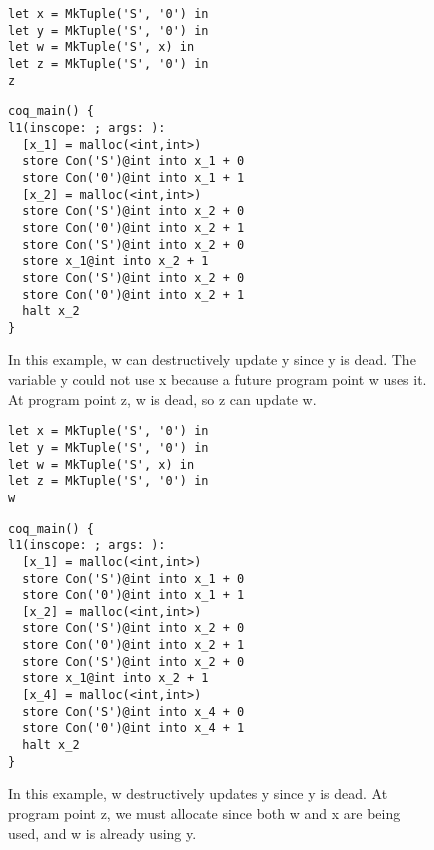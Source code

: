 \documentclass{article}
\begin{document}
\begin{figure}
\centering
\begin{minipage}[t]{.4\textwidth}
\begin{lstlisting}
let x = MkTuple('S', '0') in
let y = MkTuple('S', '0') in
let w = MkTuple('S', x) in
let z = MkTuple('S', '0') in
z
\end{lstlisting}
\end{minipage}
\hspace{20pt}
\begin{minipage}[t]{.4\textwidth}
\begin{lstlisting}
coq_main() {
l1(inscope: ; args: ):
  [x_1] = malloc(<int,int>)
  store Con('S')@int into x_1 + 0
  store Con('0')@int into x_1 + 1
  [x_2] = malloc(<int,int>)
  store Con('S')@int into x_2 + 0
  store Con('0')@int into x_2 + 1
  store Con('S')@int into x_2 + 0
  store x_1@int into x_2 + 1
  store Con('S')@int into x_2 + 0
  store Con('0')@int into x_2 + 1
  halt x_2
}
\end{lstlisting}
\end{minipage}
\label{fig:dupdate2}
\caption{In this example, w can destructively update y since y is
  dead. The variable y could not use x because a future program point
  w uses it. At program point z, w is dead, so z can update w. }
\end{figure}

\begin{figure}
\centering
\begin{minipage}[t]{.4\textwidth}
\begin{lstlisting}
let x = MkTuple('S', '0') in
let y = MkTuple('S', '0') in
let w = MkTuple('S', x) in
let z = MkTuple('S', '0') in
w
\end{lstlisting}
\end{minipage}
\hspace{20pt}
\begin{minipage}[t]{.4\textwidth}
\begin{lstlisting}
coq_main() {
l1(inscope: ; args: ):
  [x_1] = malloc(<int,int>)
  store Con('S')@int into x_1 + 0
  store Con('0')@int into x_1 + 1
  [x_2] = malloc(<int,int>)
  store Con('S')@int into x_2 + 0
  store Con('0')@int into x_2 + 1
  store Con('S')@int into x_2 + 0
  store x_1@int into x_2 + 1
  [x_4] = malloc(<int,int>)
  store Con('S')@int into x_4 + 0
  store Con('0')@int into x_4 + 1
  halt x_2
}
\end{lstlisting}
\end{minipage}
\label{fig:dupdate3}
\caption{In this example, w destructively updates y since y is
  dead. At program point z, we must allocate since both w and x are
  being used, and w is already using y. }
\end{figure}
\end{document}
